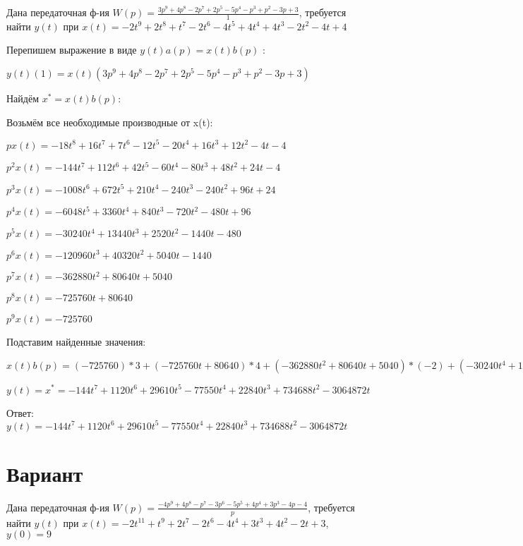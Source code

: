 \documentclass{article}
\begin{document}
{{{Дана передаточная ф-ия $W(p)=\frac{3p^{9}+4p^{8}-2p^{7}+2p^{5}-5p^{4}-p^{3}+p^{2}-3p+3}{1}$, требуется найти $y(t)$ при $x(t)=-2t^{9}+2t^{8}+t^{7}-2t^{6}-4t^{5}+4t^{4}+4t^{3}-2t^{2}-4t+4$

Перепишем выражение в виде $y(t)a(p)=x(t)b(p)$ :

$y(t)(1)=x(t)(3p^{9}+4p^{8}-2p^{7}+2p^{5}-5p^{4}-p^{3}+p^{2}-3p+3)$

Найдём $x^*=x(t)b(p)$:

Возьмём все необходимые производные от x(t):

$px(t)=-18t^{8}+16t^{7}+7t^{6}-12t^{5}-20t^{4}+16t^{3}+12t^{2}-4t-4$

$p^2x(t)=-144t^{7}+112t^{6}+42t^{5}-60t^{4}-80t^{3}+48t^{2}+24t-4$

$p^3x(t)=-1008t^{6}+672t^{5}+210t^{4}-240t^{3}-240t^{2}+96t+24$

$p^4x(t)=-6048t^{5}+3360t^{4}+840t^{3}-720t^{2}-480t+96$

$p^5x(t)=-30240t^{4}+13440t^{3}+2520t^{2}-1440t-480$

$p^6x(t)=-120960t^{3}+40320t^{2}+5040t-1440$

$p^7x(t)=-362880t^{2}+80640t+5040$

$p^8x(t)=-725760t+80640$

$p^9x(t)=-725760$

Подставим найденные значения:

$x(t)b(p) = (-725760)*3+(-725760t+80640)*4+(-362880t^{2}+80640t+5040)*(-2)+(-30240t^{4}+13440t^{3}+2520t^{2}-1440t-480)*2+(-6048t^{5}+3360t^{4}+840t^{3}-720t^{2}-480t+96)*(-5)+(-1008t^{6}+672t^{5}+210t^{4}-240t^{3}-240t^{2}+96t+24)*(-1)+(-144t^{7}+112t^{6}+42t^{5}-60t^{4}-80t^{3}+48t^{2}+24t-4)*1+(-18t^{8}+16t^{7}+7t^{6}-12t^{5}-20t^{4}+16t^{3}+12t^{2}-4t-4)*(-3)+(-18t^{8}+16t^{7}+7t^{6}-12t^{5}-20t^{4}+16t^{3}+12t^{2}-4t-4)*3=-144t^{7}+1120t^{6}+29610t^{5}-77550t^{4}+22840t^{3}+734688t^{2}-3064872t$





$y(t)=x^*=-144t^{7}+1120t^{6}+29610t^{5}-77550t^{4}+22840t^{3}+734688t^{2}-3064872t$

Ответ: $y(t) = -144t^{7}+1120t^{6}+29610t^{5}-77550t^{4}+22840t^{3}+734688t^{2}-3064872t$

\section{Вариант}

Дана передаточная ф-ия $W(p)=\frac{-4p^{9}+4p^{8}-p^{7}-3p^{6}-5p^{5}+4p^{4}+3p^{3}-4p-4}{p}$, требуется найти $y(t)$ при $x(t)=-2t^{11}+t^{9}+2t^{7}-2t^{6}-4t^{4}+3t^{3}+4t^{2}-2t+3$, $y(0)=9$

}}}
\end{document}
